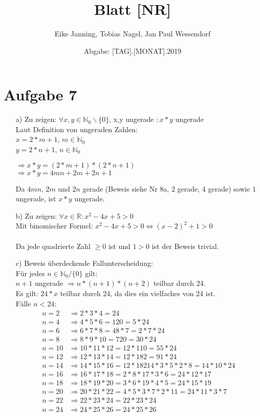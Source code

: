 \documentclass[paper = a4, ngerman]{scrartcl}
\title{Blatt [NR]}
\author{Eike Janning, Tobias Nagel, Jan Paul Wessendorf}
\date{Abgabe: [TAG].[MONAT].2019}
\begin{document}
	\maketitle
	\hrulefill
	
	\section*{Aufgabe 7}
		\begin{itemize}
			\item[a)] Zu zeigen: $\forall x,y \in \mathbb{N}_0 \backslash \{ 0 \}$, x,y ungerade $: x*y$ ungerade\\
			Laut Definition von ungeraden Zahlen:\\
			$x = 2*m+1$, $m\in \mathbb{N}_0$\\
			$y = 2*n+1$, $n\in \mathbb{N}_0$
			\begin{center}
				$\Rightarrow x*y = (2*m+1)*(2*n+1)$\\
				$\Rightarrow x*y = 4mn + 2m + 2n + 1$
			\end{center}
			Da $4mn$, $2m$ und $2n$ gerade (Beweis siehe Nr 8a, 2 gerade, 4 gerade) sowie $1$ ungerade, ist $x*y$ ungerade.
			
			\item[b)] Zu zeigen: $\forall x \in \mathbb{R} : x^2 - 4x + 5 > 0$\\
			Mit binomischer Formel: $x^2 - 4x + 5 > 0 \Leftrightarrow (x - 2)^2 + 1 > 0$\\\\
			Da jede quadrierte Zahl $\ge 0$ ist und $1 > 0$ ist der Beweis trivial.
			
			\item[c)]
			Beweis überdeckende Fallunterscheidung:\\
			Für jedes $n \in \mathbb{N}_0 / \{ 0 \}$ gilt:\\
			$n+1$ ungerade $\Rightarrow n*(n+1)*(n+2)$ teilbar durch 24.\\
			Es gilt: $24*x$ teilbar durch 24, da dies ein vielfaches von 24 ist.\\
			Fälle $n<24$:
			\begin{align*}
				n=2 &\Rightarrow 2*3*4 = 24\\
				n=4 &\Rightarrow 4*5*6 = 120 = 5*24\\
				n=6 &\Rightarrow 6*7*8 = 48*7 = 2*7*24\\
				n=8 &\Rightarrow 8*9*10 = 720 = 30*24\\
				n=10 &\Rightarrow 10*11*12 = 12*110 = 55*24\\
				n=12 &\Rightarrow 12*13*14 = 12*182 = 91*24\\
				n=14 &\Rightarrow 14*15*16 = 12*18214*3*5*2*8 = 14*10*24\\
				n=16 &\Rightarrow 16*17*18 = 2*8*17*3*6 = 24*12*17\\
				n=18 &\Rightarrow 18*19*20 = 3*6*19*4*5 = 24*15*19\\
				n=20 &\Rightarrow 20*21*22 = 4*5*3*7*2*11 = 24*11*3*7\\
				n=22 &\Rightarrow 22*23*24 = 22*23*24\\
				n=24 &\Rightarrow 24*25*26 = 24*25*26\\
			\end{align*}
			

\end{itemize}
\end{document}
